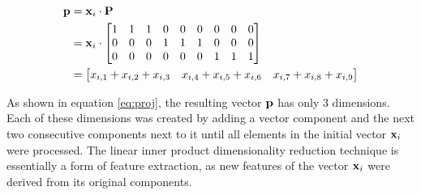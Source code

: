 \begin{equation} \label{eq:proj}
    \begin{split}
        \boldsymbol{\mathbf{p}} 
        &= 
            \boldsymbol{\mathbf{x}}_{i} \cdot \boldsymbol{\mathbf{P}} \\
        &=
            \boldsymbol{\mathbf{x}}_{i} \cdot
            \begin{bmatrix}
                1 & 1 & 1 & 0 & 0 & 0 & 0 & 0 & 0 \\
                0 & 0 & 0 & 1 & 1 & 1 & 0 & 0 & 0 \\
                0 & 0 & 0 & 0 & 0 & 0 & 1 & 1 & 1 \\
            \end{bmatrix} \\  
        &=
            \begin{bmatrix}
                x_{i,1} + x_{i,2} + x_{i,3} & x_{i,4} + x_{i,5} + x_{i,6} & x_{i,7} + x_{i,8} + x_{i,9}
            \end{bmatrix} \\
    \end{split}
\end{equation}

As shown in equation \ref{eq:proj}, the resulting vector $\boldsymbol{\mathbf{p}}$ has only 3 dimensions. Each of these dimensions was created by adding a vector component and the next two consecutive components next to it until all elements in the initial vector $\boldsymbol{\mathbf{x}}_i$ were processed. The linear inner product dimensionality reduction technique is essentially a form of feature extraction, as new features of the vector $\boldsymbol{\mathbf{x}}_i$ were derived from its original components.